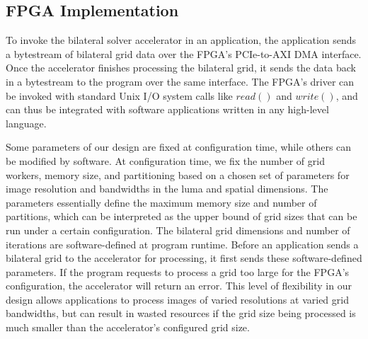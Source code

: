 \subsection{FPGA Implementation}

To invoke the bilateral solver accelerator in an application, the application sends a bytestream of bilateral grid data over the FPGA's PCIe-to-AXI DMA interface.
Once the accelerator finishes processing the bilateral grid, it sends the data back in a bytestream to the program over the same interface.
The FPGA's driver can be invoked with standard Unix I/O system calls like $read()$ and $write()$, and can thus be integrated with software applications written in any high-level language.

Some parameters of our design are fixed at configuration time, while others can be modified by software.
At configuration time, we fix the number of grid workers, memory size, and partitioning based on a chosen set of parameters for image resolution and bandwidths in the luma and spatial dimensions.
The parameters essentially define the maximum memory size and number of partitions, which can be interpreted as the upper bound of grid sizes that can be run under a certain configuration.
The bilateral grid dimensions and number of iterations are software-defined at program runtime.
Before an application sends a bilateral grid to the accelerator for processing, it first sends these software-defined parameters.
If the program requests to process a grid too large for the FPGA's configuration, the accelerator will return an error.
This level of flexibility in our design allows applications to process images of varied resolutions at varied grid bandwidths, but can result in wasted resources if the grid size being processed is much smaller than the accelerator's configured grid size.
